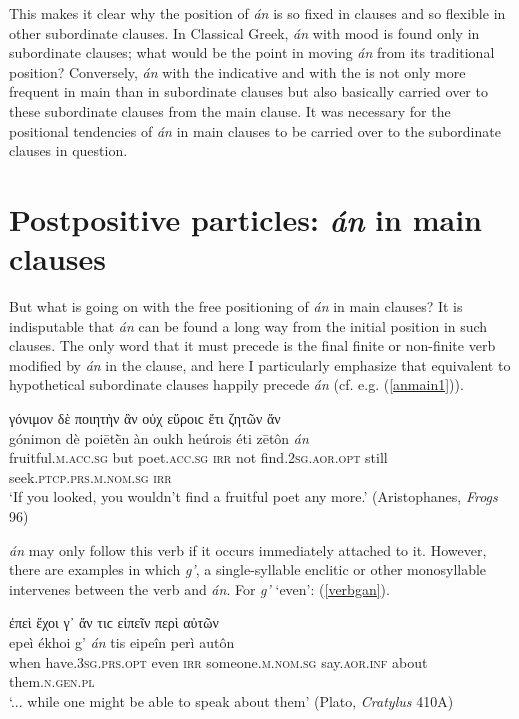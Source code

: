 This makes it clear why the position of \emph{án} is so fixed in  clauses and so flexible in other subordinate clauses. In Classical Greek, \emph{án} with  mood is found only in subordinate clauses; what would be the point in moving \emph{án} from its traditional position? Conversely, \emph{án} with the indicative and with the  is not only more frequent in main than in subordinate clauses but also basically carried over to these subordinate clauses from the main clause. It was necessary for the positional tendencies of \emph{án} in main clauses to be carried over to the subordinate clauses in question.


\section{Postpositive particles: \emph{án} in main clauses}

But what is going on with the free positioning of \emph{án} in main clauses? It is indisputable that \emph{án} can be found a long way from the initial position in such clauses. The only word that it must precede is the final finite or non-finite verb modified by \emph{án} in the clause, and here I particularly emphasize that  equivalent to hypothetical subordinate clauses happily precede \emph{án} (cf. e.g. (\ref{anmain1})).

\begin{exe}
\ex γόνιμον δὲ ποιητὴν ἂν οὐχ εὕροιϲ ἔτι ζητῶν ἄν\\
\gll gónimon dè poiētḕn àn oukh heúrois éti zētôn \emph{án}\\
fruitful.\textsc{m.acc.sg} but poet.\textsc{acc.sg} \textsc{irr} not find.\textsc{2sg.aor.opt} still seek.\textsc{ptcp.prs.m.nom.sg} \textsc{irr}\\
\trans `If you looked, you wouldn't find a fruitful poet any more.' (Aristophanes, \textit{Frogs} 96)
\label{anmain1}
\end{exe}

\emph{án} may only follow this verb if it occurs immediately attached to it. However, there are examples in which \emph{g'}, a single-syllable enclitic or other monosyllable intervenes between the verb and \emph{án}. For \emph{g'} `even': (\ref{verbgan}).

\begin{exe}
\ex ἐπεὶ ἔχοι γ᾽ ἄν τιϲ εἰπεῖν περὶ αὐτῶν\\
\gll epeì ékhoi g' \emph{án} tis eipeîn perì autôn\\
when have.\textsc{3sg.prs.opt} even \textsc{irr} someone.\textsc{m.nom.sg} say.\textsc{aor.inf} about them.\textsc{n.gen.pl}\\
\trans `... while one might be able to speak about them' (Plato, \textit{Cratylus} 410A)
\label{verbgan}
\end{exe}

